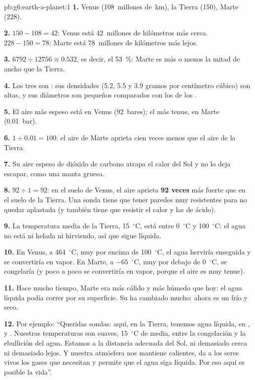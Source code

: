 \begin{solution}{pb:g6:earth-a-planet:1}
\textbf{1.} Venus (108~millones de~km), la Tierra (150), Marte (228).

\textbf{2.} $150 - 108 = 42$: Venus está 42~millones de kilómetros más
cerca. $228 - 150 = 78$: Marte está 78~millones de kilómetros más lejos.

\textbf{3.} $6792 \div 12756 \approx 0.532$, es decir, el 53~\%: Marte es
más o menos la mitad de ancho que la Tierra.

\textbf{4.} Los tres son : sus densidades (5.2, 5.5 y 3.9
gramos por centímetro cúbico) son altas, y sus diámetros son pequeños
comparados con los de los .

\textbf{5.} El aire más espeso está en Venus (92~bares); el más tenue, en
Marte (0.01~bar).

\textbf{6.} $1 \div 0.01 = 100$: el aire de Marte aprieta cien veces menos
que el aire de la Tierra.

\textbf{7.} Su aire espeso de dióxido de carbono atrapa el calor del Sol y
no lo deja escapar, como una manta gruesa.

\textbf{8.} $92 \div 1 = 92$: en el suelo de Venus, el aire aprieta
\textbf{92 veces} más fuerte que en el suelo de la Tierra. Una sonda tiene
que tener paredes muy resistentes para no quedar aplastada (y también tiene
que resistir el calor y las  de ácido).

\textbf{9.} La temperatura media de la Tierra, 15~$^\circ$C, está entre
0~$^\circ$C y 100~$^\circ$C: el agua no está ni helada ni hirviendo, así
que sigue líquida.

\textbf{10.} En Venus, a 464~$^\circ$C, muy por encima de 100~$^\circ$C,
el agua herviría enseguida y se convertiría en vapor. En Marte, a
$-65$~$^\circ$C, muy por debajo de 0~$^\circ$C, se congelaría (y poco a
poco se convertiría en vapor, porque el aire es muy tenue).

\textbf{11.} Hace mucho tiempo, Marte era más cálido y más húmedo que hoy:
el agua líquida podía correr por su superficie. Su  ha cambiado
mucho: ahora es un  frío y seco.

\textbf{12.} Por ejemplo: ``Queridas sondas: aquí, en la Tierra, tenemos
agua líquida, en ,  y . Nuestras temperaturas son suaves,
15~$^\circ$C de media, entre la congelación y la ebullición del agua.
Estamos a la distancia adecuada del Sol, ni demasiado cerca ni demasiado
lejos. Y nuestra atmósfera nos mantiene calientes, da a los seres vivos los
gases que necesitan y permite que el agua siga líquida. Por eso aquí es
posible la vida''.
\end{solution}
